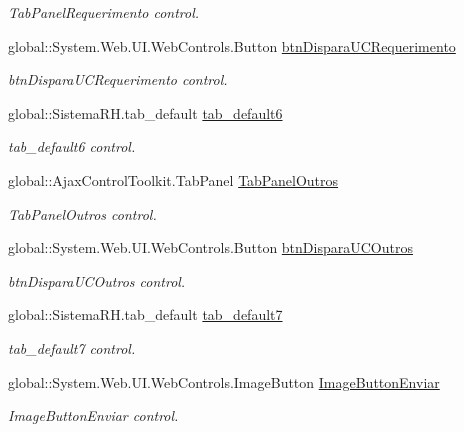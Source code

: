 \begin{DoxyCompactItemize}
\begin{DoxyCompactList}\small\item\em TabPanelRequerimento control. \item\end{DoxyCompactList}\item 
global::System.Web.UI.WebControls.Button \hyperlink{class_sistema_r_h_1_1_alterar_colaborador_a9710c06bd10f562da691750e622c9879}{btnDisparaUCRequerimento}
\begin{DoxyCompactList}\small\item\em btnDisparaUCRequerimento control. \item\end{DoxyCompactList}\item 
global::SistemaRH.tab\_\-default \hyperlink{class_sistema_r_h_1_1_alterar_colaborador_ad7c017105136e82f938f8232de1566ed}{tab\_\-default6}
\begin{DoxyCompactList}\small\item\em tab\_\-default6 control. \item\end{DoxyCompactList}\item 
global::AjaxControlToolkit.TabPanel \hyperlink{class_sistema_r_h_1_1_alterar_colaborador_a90b9b577c4fdc83f57c8692edb554b8d}{TabPanelOutros}
\begin{DoxyCompactList}\small\item\em TabPanelOutros control. \item\end{DoxyCompactList}\item 
global::System.Web.UI.WebControls.Button \hyperlink{class_sistema_r_h_1_1_alterar_colaborador_a113f7ebadce2409e1401d091ce62e3f1}{btnDisparaUCOutros}
\begin{DoxyCompactList}\small\item\em btnDisparaUCOutros control. \item\end{DoxyCompactList}\item 
global::SistemaRH.tab\_\-default \hyperlink{class_sistema_r_h_1_1_alterar_colaborador_ab13ac02b44160a0263bbaa03b37cdf7e}{tab\_\-default7}
\begin{DoxyCompactList}\small\item\em tab\_\-default7 control. \item\end{DoxyCompactList}\item 
global::System.Web.UI.WebControls.ImageButton \hyperlink{class_sistema_r_h_1_1_alterar_colaborador_a36f7c38f1a0cacc240f62654146feb7f}{ImageButtonEnviar}
\begin{DoxyCompactList}\small\item\em ImageButtonEnviar control. \item\end{DoxyCompactList}\end{DoxyCompactItemize}


